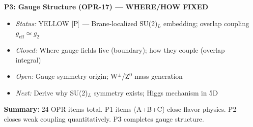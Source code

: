 \begin{tcolorbox}[colback=blue!5, colframe=blue!60!black,
    title=\textbf{OPR Closure Plan: Prioritized Research Program}]
\textbf{P3: Gauge Structure (OPR-17) --- WHERE/HOW FIXED}
\begin{itemize}[nosep]
    \item \emph{Status:} YELLOW [P] --- Brane-localized SU(2)$_L$ embedding; overlap coupling $g_{\text{eff}} \simeq g_2$
    \item \emph{Closed:} Where gauge fields live (boundary); how they couple (overlap integral)
    \item \emph{Open:} Gauge symmetry origin; W$^\pm$/Z$^0$ mass generation
    \item \emph{Next:} Derive why SU(2)$_L$ symmetry exists; Higgs mechanism in 5D
\end{itemize}

\textbf{Summary:} 24 OPR items total. P1 items (A+B+C) close flavor physics.
P2 closes weak coupling quantitatively. P3 completes gauge structure.
\end{tcolorbox}


